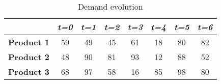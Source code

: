 \documentclass{article}
\begin{document}
\begin{table}[H]
    \centering
    \begin{tabular}{|c|c|c|c|c|c|c|c|}
    \hline
    & \textbf{\textit{t=0}} & \textbf{\textit{t=1}} & \textbf{\textit{t=2}} & \textbf{\textit{t=3}} & \textbf{\textit{t=4}} & \textbf{\textit{t=5}} & \textbf{\textit{t=6}}\\
    \hline
    \textbf{Product 1} & 59 & 49 & 45 & 61 & 18 & 80 & 82\\
    \hline
    \textbf{Product 2} & 48 & 90 & 81 & 93 & 12 & 88 & 52\\
    \hline
    \textbf{Product 3} & 68 & 97 & 58 & 16 & 85 & 98 & 80\\
    \hline
    \end{tabular}
    \caption{Demand evolution}
    \label{tab:dem_ev}
\end{table}
\end{document}
